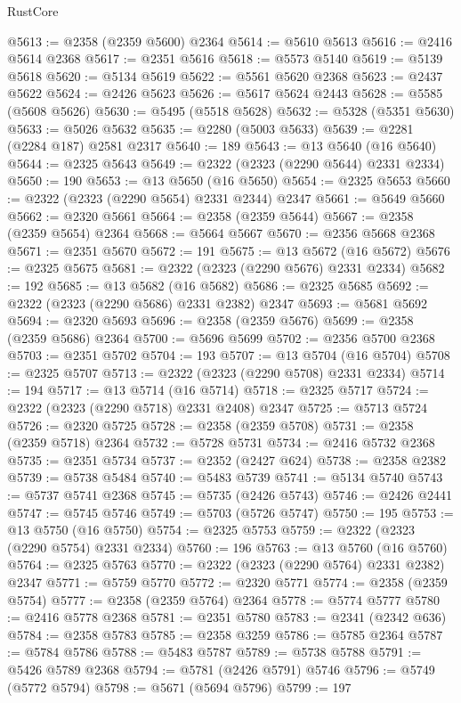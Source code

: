 \begin{lexlean}{RustCore}
\begin{coremodule}
@5613 := @2358 (@2359 @5600) @2364
@5614 := @5610 @5613
@5616 := @2416 @5614 @2368
@5617 := @2351 @5616
@5618 := @5573 @5140
@5619 := @5139 @5618
@5620 := @5134 @5619
@5622 := @5561 @5620 @2368
@5623 := @2437 @5622
@5624 := @2426 @5623
@5626 := @5617 @5624 @2443
@5628 := @5585 (@5608 @5626)
@5630 := @5495 (@5518 @5628)
@5632 := @5328 (@5351 @5630)
@5633 := @5026 @5632
@5635 := @2280 (@5003 @5633)
@5639 := @2281 (@2284 @187) @2581 @2317
@5640 := 189
@5643 := @13 @5640 (@16 @5640)
@5644 := @2325 @5643
@5649 := @2322 (@2323 (@2290 @5644) @2331 @2334)
@5650 := 190
@5653 := @13 @5650 (@16 @5650)
@5654 := @2325 @5653
@5660 := @2322 (@2323 (@2290 @5654) @2331 @2344) @2347
@5661 := @5649 @5660
@5662 := @2320 @5661
@5664 := @2358 (@2359 @5644)
@5667 := @2358 (@2359 @5654) @2364
@5668 := @5664 @5667
@5670 := @2356 @5668 @2368
@5671 := @2351 @5670
@5672 := 191
@5675 := @13 @5672 (@16 @5672)
@5676 := @2325 @5675
@5681 := @2322 (@2323 (@2290 @5676) @2331 @2334)
@5682 := 192
@5685 := @13 @5682 (@16 @5682)
@5686 := @2325 @5685
@5692 := @2322 (@2323 (@2290 @5686) @2331 @2382) @2347
@5693 := @5681 @5692
@5694 := @2320 @5693
@5696 := @2358 (@2359 @5676)
@5699 := @2358 (@2359 @5686) @2364
@5700 := @5696 @5699
@5702 := @2356 @5700 @2368
@5703 := @2351 @5702
@5704 := 193
@5707 := @13 @5704 (@16 @5704)
@5708 := @2325 @5707
@5713 := @2322 (@2323 (@2290 @5708) @2331 @2334)
@5714 := 194
@5717 := @13 @5714 (@16 @5714)
@5718 := @2325 @5717
@5724 := @2322 (@2323 (@2290 @5718) @2331 @2408) @2347
@5725 := @5713 @5724
@5726 := @2320 @5725
@5728 := @2358 (@2359 @5708)
@5731 := @2358 (@2359 @5718) @2364
@5732 := @5728 @5731
@5734 := @2416 @5732 @2368
@5735 := @2351 @5734
@5737 := @2352 (@2427 @624)
@5738 := @2358 @2382
@5739 := @5738 @5484
@5740 := @5483 @5739
@5741 := @5134 @5740
@5743 := @5737 @5741 @2368
@5745 := @5735 (@2426 @5743)
@5746 := @2426 @2441
@5747 := @5745 @5746
@5749 := @5703 (@5726 @5747)
@5750 := 195
@5753 := @13 @5750 (@16 @5750)
@5754 := @2325 @5753
@5759 := @2322 (@2323 (@2290 @5754) @2331 @2334)
@5760 := 196
@5763 := @13 @5760 (@16 @5760)
@5764 := @2325 @5763
@5770 := @2322 (@2323 (@2290 @5764) @2331 @2382) @2347
@5771 := @5759 @5770
@5772 := @2320 @5771
@5774 := @2358 (@2359 @5754)
@5777 := @2358 (@2359 @5764) @2364
@5778 := @5774 @5777
@5780 := @2416 @5778 @2368
@5781 := @2351 @5780
@5783 := @2341 (@2342 @636)
@5784 := @2358 @5783
@5785 := @2358 @3259
@5786 := @5785 @2364
@5787 := @5784 @5786
@5788 := @5483 @5787
@5789 := @5738 @5788
@5791 := @5426 @5789 @2368
@5794 := @5781 (@2426 @5791) @5746
@5796 := @5749 (@5772 @5794)
@5798 := @5671 (@5694 @5796)
@5799 := 197

\end{coremodule}
\end{lexlean}
